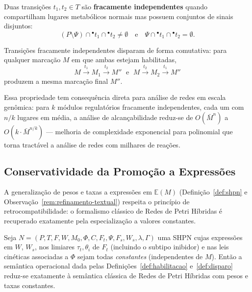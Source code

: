 \begin{definition}
\label{def:independencia-fraca}
Duas transições $t_1, t_2 \in T$ são \textbf{fracamente independentes} quando
compartilham lugares metabólicos normais mas possuem conjuntos de sinais
disjuntos:
\[
(P \setminus \Psi) \cap {}^\bullet t_1 \cap {}^\bullet t_2 \neq \emptyset
\quad\text{e}\quad
\Psi \cap {}^\bullet t_1 \cap {}^\bullet t_2 = \emptyset.
\]
\end{definition}

\begin{theorem}
\label{thm:independencia-fraca}
Transições fracamente independentes disparam de forma comutativa: para qualquer
marcação $M$ em que ambas estejam habilitadas,
\[
M \xrightarrow{t_1} M_1 \xrightarrow{t_2} M'' \;\text{ e }\;
M \xrightarrow{t_2} M_2 \xrightarrow{t_1} M''
\]
produzem a mesma marcação final $M''$.
\end{theorem}

Essa propriedade tem consequência direta para análise de redes em escala
genômica: para $k$ módulos regulatórios fracamente independentes, cada um com
$n/k$ lugares em média, a análise de alcançabilidade reduz-se de
$O(\bar{M}^n)$ a $O(k \cdot \bar{M}^{n/k})$ --- melhoria de complexidade
exponencial para polinomial que torna tractável a análise de redes com milhares
de reações.

\subsection{Conservatividade da Promoção a Expressões}
\label{subsec:conservatividade}

A generalização de pesos e taxas a expressões em $\mathbb{E}(M)$
(Definição~\ref{def:shpn} e Observação~\ref{rem:refinamento-textual})
respeita o princípio de retrocompatibilidade: o formalismo clássico de
Redes de Petri Híbridas é recuperado exatamente pela especialização a
valores constantes.

\begin{proposition}
\label{prop:conservatividade}
Seja $N = (P, T, F, W, M_0, \Phi, C, F_t, \Psi, F_s, W_s, \lambda, \Gamma)$
uma SHPN cujas expressões em $W$, $W_s$, nos limiares $\tau_t, \theta_i$
de $F_t$ (incluindo o subtipo inibidor) e nas leis cinéticas associadas a
$\Phi$ sejam todas \emph{constantes} (independentes de $M$). Então a
semântica operacional dada pelas Definições~\ref{def:habilitacao}
e~\ref{def:disparo} reduz-se exatamente à semântica clássica de Redes de
Petri Híbridas com pesos e taxas constantes.
\end{proposition}

